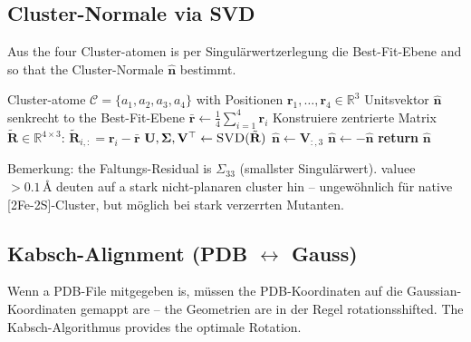 \documentclass[11pt,a4paper,twoside]{article}
\providecommand{\angstrom}{\text{\AA}}    %
\theoremstyle{remark}
\begin{document}
\subsection{Cluster-Normale via SVD}
\label{app:pseudo-svd}

Aus the four Cluster-atomen is per Singul\"arwertzerlegung die
Best-Fit-Ebene and so that the Cluster-Normale $\hat{\mathbf{n}}$ bestimmt.

\begin{algorithm}[H]
\caption{\textsc{ClusterNormale}}
\begin{algorithmic}[1]
\Require Cluster-atome $\mathcal{C} = \{a_1, a_2, a_3, a_4\}$
        with Positionen $\mathbf{r}_1, \ldots, \mathbf{r}_4 \in \mathbb{R}^3$
\Ensure Unitsvektor $\hat{\mathbf{n}}$ senkrecht to the Best-Fit-Ebene
\State $\bar{\mathbf{r}} \gets \frac{1}{4} \sum_{i=1}^{4} \mathbf{r}_i$
\State Konstruiere zentrierte Matrix
       $\tilde{\mathbf{R}} \in \mathbb{R}^{4\times 3}$:
       $\tilde{\mathbf{R}}_{i,:} = \mathbf{r}_i - \bar{\mathbf{r}}$
\State $\mathbf{U}, \boldsymbol{\Sigma}, \mathbf{V}^\top \gets
       \textsc{SVD}(\tilde{\mathbf{R}})$
\State $\hat{\mathbf{n}} \gets \mathbf{V}_{:,3}$
  
  \State $\hat{\mathbf{n}} \gets -\hat{\mathbf{n}}$
\EndIf
\State \textbf{return} $\hat{\mathbf{n}}$
\end{algorithmic}
\end{algorithm}

Bemerkung: the Faltungs-Residual is $\Sigma_{33}$ (smallster Singul\"arwert).
valuee $> 0.1\,\angstrom$ deuten auf a stark nicht-planaren cluster hin --
ungew\"ohnlich f\"ur native [2Fe-2S]-Cluster, but m\"oglich bei stark
verzerrten Mutanten.

\subsection{Kabsch-Alignment (PDB $\leftrightarrow$ Gauss)}
\label{app:pseudo-kabsch}

Wenn a PDB-File mitgegeben is, m\"ussen the PDB-Koordinaten auf
die Gaussian-Koordinaten gemappt are -- the Geometrien are in der
Regel rotationsshifted. The Kabsch-Algorithmus
\cite{Kabsch1976} provides the optimale Rotation.
\end{document}
